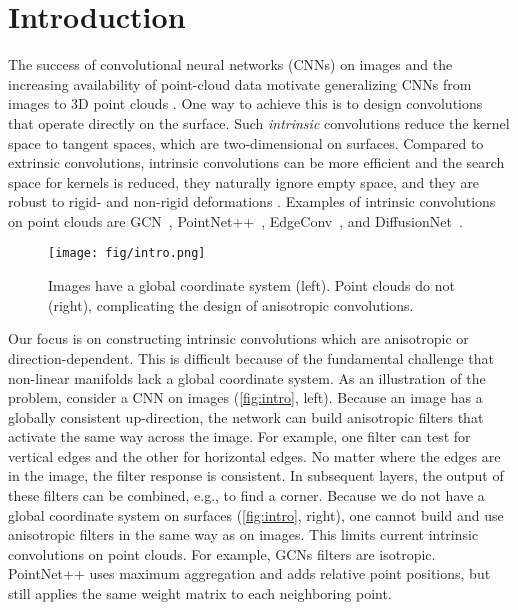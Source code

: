 \documentclass[acmtog, authorversion]{acmart}
\begin{document}


\maketitle

\section{Introduction}
The success of convolutional neural networks (CNNs) on images and the increasing availability of point-cloud data motivate generalizing CNNs from images to 3D point clouds \cite{guo2020survey, s19194188, Bronstein2017}. One way to achieve this is to design convolutions that operate directly on the surface. Such \textit{intrinsic} convolutions reduce the kernel space to tangent spaces, which are two-dimensional on surfaces. Compared to extrinsic convolutions, intrinsic convolutions can be more efficient and the search space for kernels is reduced, they naturally ignore empty space, and they are robust to rigid- and non-rigid deformations \cite{Boscaini2016}. Examples of intrinsic convolutions on point clouds are GCN~\cite{kipf2017}, PointNet++~\cite{Qi2017b}, EdgeConv~\cite{Wang2019}, and DiffusionNet~\cite{Sharp2020DiffusionIA}. 

\begin{figure}
    \centering
    \texttt{[image: fig/intro.png]}
    \caption{Images have a global coordinate system (left). Point clouds do not (right), complicating the design of anisotropic convolutions.}
    \label{fig:intro}
\end{figure}

Our focus is on constructing intrinsic convolutions which are anisotropic or direction-dependent. This is difficult because of the fundamental challenge that non-linear manifolds lack a global coordinate system.
As an illustration of the problem, consider a CNN on images (\autoref{fig:intro}, left).
Because an image has a globally consistent up-direction, the network can build anisotropic filters that activate the same way across the image.
For example, one filter can test for vertical edges and the other for horizontal edges. No matter where the edges are in the image, the filter response is consistent. In subsequent layers, the output of these filters can be combined, e.g., to find a corner.
Because we do not have a global coordinate system on surfaces (\autoref{fig:intro}, right), one cannot build and use anisotropic filters in the same way as on images. This limits current intrinsic convolutions on point clouds. For example, GCNs filters are isotropic. PointNet++ uses maximum aggregation and adds relative point positions, but still applies the same weight matrix to each neighboring point.
\end{document}
